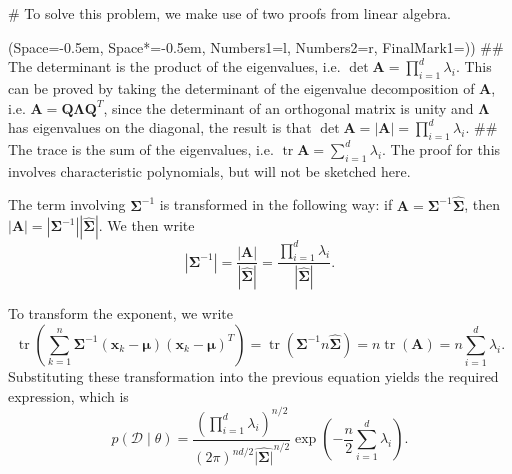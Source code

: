 \documentclass[12pt, a4paper]{article}
\newcommand{\listSpace}{-0.5em}%
\newcommand{\D}{\mathcal{D}}
\newcommand{\vect}[1]{\bm{#1}}
\newcommand{\abs}[1]{\left\lvert#1\right\rvert}
\begin{document}
\begin{easylist}[enumerate]
# To solve this problem, we make use of two proofs from linear algebra.

\begin{easylist}
\ListProperties(Space=\listSpace, Space*=\listSpace, Numbers1=l, Numbers2=r, FinalMark1={)})
## The determinant is the product of the eigenvalues, i.e. $\det \vect{A} = \prod_{i=1}^{d} \lambda_i$.
This can be proved by taking the determinant of the eigenvalue decomposition of $\vect{A}$, i.e. $\vect{A}  = \vect{Q}  \vect{\Lambda} \vect{Q}^T$, since the determinant of an orthogonal matrix is unity and $\vect{\Lambda}$ has eigenvalues on the diagonal, the result is that $\det \vect{A} = \abs{\vect{A}} = \prod_{i=1}^{d} \lambda_i$.
## The trace is the sum of the eigenvalues, i.e. $\operatorname{tr} \vect{A} =\sum_{i=1}^{d} \lambda_i$. The proof for this involves characteristic polynomials, but will not be sketched here.
\end{easylist}

The term involving $\vect{\Sigma}^{-1}$ is transformed in the following way: if $\vect{A} = \vect{\Sigma}^{-1} \hat{\vect{\Sigma}}$, then $\abs{\vect{A}} = \abs{\vect{\Sigma}^{-1}} | \hat{\vect{\Sigma}} |$. We then write
\begin{equation*}
	\abs{\vect{\Sigma}^{-1}} = \frac{\abs{\vect{A}}}{| \hat{\vect{\Sigma}} |} = \frac{\prod_{i=1}^{d} \lambda_i}{| \hat{\vect{\Sigma}} |}.
\end{equation*}

To transform the exponent, we write
\begin{equation*}
	 \operatorname{tr} \left( \sum_{k=1}^{n}  \vect{\Sigma}^{-1} \left( \vect{x}_k - \vect{\mu} \right) \left( \vect{x}_k - \vect{\mu} \right)^T \right)
	 =
	 \operatorname{tr} \left( \vect{\Sigma}^{-1} n \hat{\vect{\Sigma}}  \right)
	 =
	 n  \operatorname{tr} \left( \vect{A} \right) = n \sum_{i=1}^{d} \lambda_i.
\end{equation*}
Substituting these transformation into the previous equation yields the required expression, which is
\begin{equation}
\label{eq:prob3_13}
	p(\D  \mid  \theta) = \frac{\left( \prod_{i=1}^{d} \lambda_i \right)^{n/2}}{\left(2 \pi \right)^{nd/2} \hat{\abs{\vect{\Sigma}}}^{n/2} } \exp \left( -\frac{n}{2} \sum_{i=1}^{d} \lambda_i \right).
\end{equation}


\end{easylist}
\end{document}
